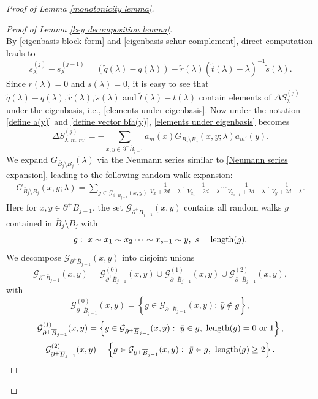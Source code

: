 \documentclass[11pt,reqno,UTF8,twoside]{amsart}
\newcommand{\tq}{\tilde{q}}
\newcommand{\ts}{\tilde{s}}
\newcommand{\tr}{\tilde{r}}
\renewcommand{\tt}{\tilde{t}}
\newcommand{\length}{{\rm length}}
\newcommand{\mcG}{\mathcal{G}}
\newcommand{\barB}{\overline{B}}
\newcommand{\smallSj}{s^{(j)}}
\newcommand{\smallSjminusone}{s^{(j-1)}}
\newcommand{\diffSj}{\Delta {S}^{(j)}}
\theoremstyle{definition}
\numberwithin{equation}{section}
\begin{document}
\begin{proof}[Proof of Lemma \ref{monotonicity lemma}]
\begin{proof}[Proof of Lemma \ref{key decomposition lemma}]
 \noindent {\Large {\textbf{(Term $(\smallSj_{\lambda}-\smallSjminusone_\lambda)$)}}     }\\

 \noindent By \eqref{eigenbasis block form} and \eqref{eigenbasis schur complement}, direct computation leads to 
\begin{equation}\label{baby decomposition}
  \smallSj_{\lambda}-\smallSjminusone_\lambda =(\tilde{q}(\lambda)-q(\lambda))- \tilde{r}(\lambda)(\tilde{t}(\lambda)-\lambda)^{-1}\tilde{s}(\lambda).
\end{equation}
Since $r(\lambda)=0$ and $s(\lambda)=0$, it is easy to see that  $\tq(\lambda)-q(\lambda),\tr(\lambda),\ts(\lambda)$ and $\tt(\lambda)-t(\lambda)$ contain elements of $\diffSj_{\lambda}$ under the eigenbasis, i.e.,  \eqref{elements under eigenbasis}.
Now under the notation \eqref{define a(y)} and \eqref{define vector bfa(y)}, \eqref{elements under eigenbasis} becomes
\begin{equation}\label{elements in bfa}
    \diffSj_{\lambda,m,m'}=-\sum_{x,y\in \partial^+ \barB_{j-1}}a_{m}(x)G_{\barB_j\setminus B_j }(x,y;\lambda) a_{m'}(y).
\end{equation}
We expand $G_{\barB_{j}\setminus B_j}(\lambda)$ via the Neumann series similar to  \eqref{Neumann series expansion}, leading to the following random walk expansion:
\begin{align}\label{K random walk expansion}
  G_{\barB_{j}\setminus B_j}(x,y;\lambda) =\sum_{g\in \mcG_{\partial^+ \barB_{j-1}}(x,y)}  \frac{1}{V_{x}+2d-\lambda}\cdot \frac{1}{V_{x_1}+2d-\lambda}\cdots \frac{1}{V_{x_{s-1}}+2d-\lambda}\cdot \frac{1}{V_{y}+2d-\lambda}.
\end{align}
Here for $x,y\in \partial^+ \barB_{j-1}$, the set $\mcG_{\partial^+ \barB_{j-1}}(x,y)$ contains all random walks  $g$ contained in $\barB_{j}\setminus B_j$ with 
\[g:\ x\sim x_1\sim x_2\cdots \sim x_{s-1}\sim y,\ s=\length(g) .\]
We decompose $\mcG_{\partial^+ \barB_{j-1}}(x,y)$ into disjoint unions 
\[\mcG_{\partial^+ \barB_{j-1}}(x,y) =\mcG_{\partial^+ \barB_{j-1}}^{(0)} (x,y)\cup \mcG_{\partial^+ \barB_{j-1}}^{(1)} (x,y)\cup \mcG_{\partial^+ \barB_{j-1}}^{(2)} (x,y) ,\]
with
\[\mcG_{\partial^+ \barB_{j-1}}^{(0)} (x,y)= \left\{ g\in \mcG_{\partial^+ \barB_{j-1}} (x,y) :\  \bar{y}\notin g \right\},\]
\[\mcG_{\partial^+ \barB_{j-1}}^{(1)} (x,y)= \left\{ g\in \mcG_{\partial^+ \barB_{j-1}} (x,y) : \ \bar{y}\in g ,\ \length(g)=0 \ {\rm or} \ 1 \right\},\]
\[\mcG_{\partial^+ \barB_{j-1}}^{(2)} (x,y)= \left\{ g\in \mcG_{\partial^+ \barB_{j-1}} (x,y) : \ \bar{y}\in g ,\ \length(g)\geq 2 \right\}.\]

\end{proof}
\end{proof}
\end{document}
